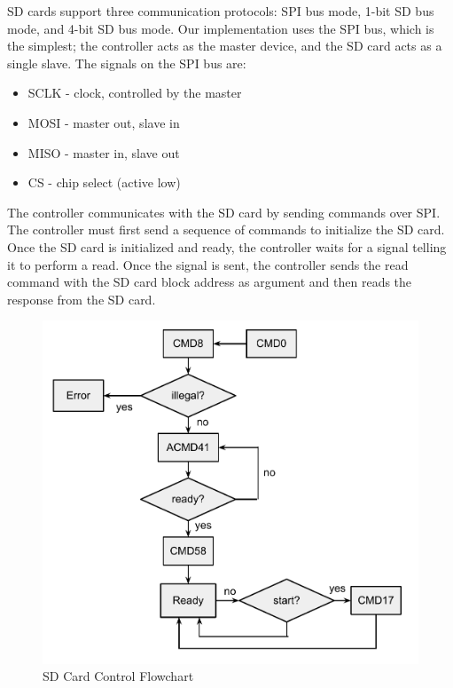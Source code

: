 \documentclass{article}
\begin{document}
SD cards support three communication protocols: SPI bus mode, 1-bit SD bus
mode, and 4-bit SD bus mode. Our implementation uses the SPI bus, which is the
simplest; the controller acts as the master device, and the SD card acts as a
single slave.  The signals on the SPI bus are:

\begin{itemize}
	\item SCLK - clock, controlled by the master
	\item MOSI - master out, slave in
	\item MISO - master in, slave out
	\item CS - chip select (active low)
\end{itemize}

The controller communicates with the SD card by sending commands over SPI.
The controller must first send a sequence of commands to initialize the SD card.
Once the SD card is initialized and ready, the controller waits for a signal
telling it to perform a read. Once the signal is sent, the controller sends
the read command with the SD card block address as argument and then reads
the response from the SD card.

\begin{figure}[H]
	\centering
	\includegraphics[scale=0.3]{sd-controller}
	\caption{SD Card Control Flowchart}
\end{figure}
\end{document}
